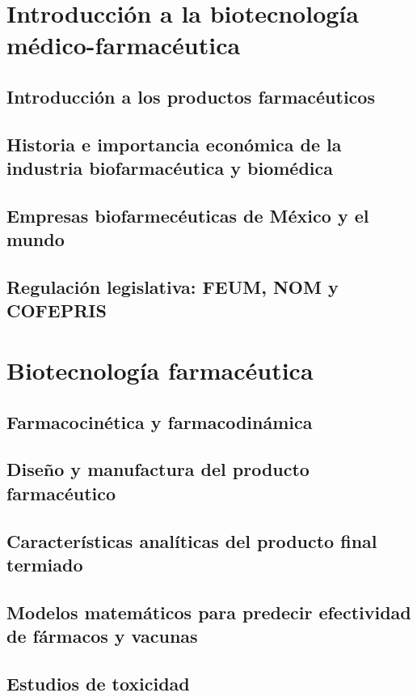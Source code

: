 \documentclass{../summarie}
\begin{document}
\Portada
\Indice
\fancystyle
\onehalfspacing


\part{Introducción a la biotecnología médico-farmacéutica}

    \chapter{Introducción a los productos farmacéuticos}
    \chapter{Historia e importancia económica de la industria biofarmacéutica y biomédica}
    \chapter{Empresas biofarmecéuticas de México y el mundo}
    \chapter{Regulación legislativa: FEUM, NOM y COFEPRIS}

\part{Biotecnología farmacéutica}

    \chapter{Farmacocinética y farmacodinámica}
    \chapter{Diseño y manufactura del producto farmacéutico}
    \chapter{Características analíticas del producto final termiado}
    \chapter{Modelos matemáticos para predecir efectividad de fármacos y vacunas}
    \chapter{Estudios de toxicidad}
\end{document}
